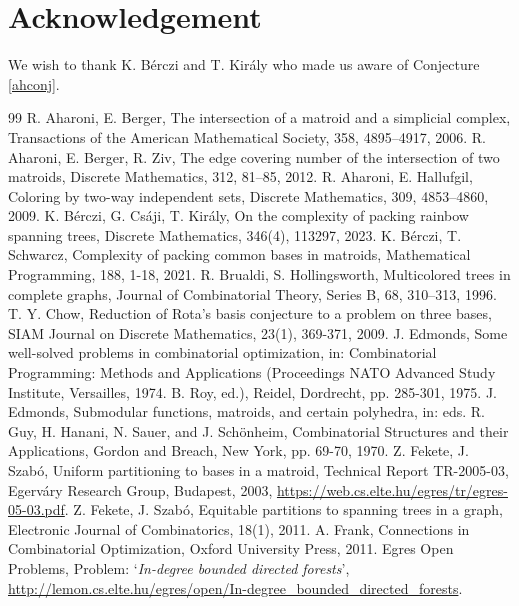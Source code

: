 \documentclass{article}
\begin{document}
\section*{Acknowledgement}
We wish to thank K. Bérczi and T. Kir\'aly who made us aware of Conjecture \ref{ahconj}.
\begin{thebibliography}{99}
 R. Aharoni, E. Berger, The intersection of a matroid and a simplicial complex, Transactions of the  American Mathematical Society, 358, 4895--4917, 2006.
 R. Aharoni, E. Berger, R. Ziv, The edge covering number of the intersection of two matroids, Discrete Mathematics, 312, 81--85, 2012.
 R. Aharoni, E. Hallufgil, Coloring by two-way independent sets, Discrete Mathematics, 309, 4853--4860, 2009.
 K. Bérczi, G. Cs\'aji, T. Kir\'aly, On the complexity of packing rainbow spanning trees, Discrete Mathematics, 346(4), 113297, 2023.
  K. Bérczi, T. Schwarcz, Complexity of packing common bases in matroids, Mathematical Programming, 188, 1-18, 2021.
 R. Brualdi, S. Hollingsworth, Multicolored trees in complete graphs, Journal of Combinatorial Theory, Series B, 68, 310–313, 1996.
 T. Y. Chow, Reduction of Rota's basis conjecture to a problem on three bases, SIAM Journal on Discrete Mathematics, 23(1), 369-371, 2009.
 J. Edmonds, Some well-solved problems in combinatorial optimization, in: Combinatorial Programming: Methods and Applications (Proceedings NATO Advanced Study Institute, Versailles, 1974. B. Roy, ed.), Reidel, Dordrecht, pp. 285-301, 1975.
 J. Edmonds, Submodular functions, matroids, and certain polyhedra, in: eds. R. Guy, H. Hanani, N. Sauer, and J. Sch{\"o}nheim, Combinatorial Structures and their Applications, Gordon and Breach, New York, pp. 69-70, 1970.
 Z. Fekete, J. Szab\'o, Uniform partitioning to bases in a matroid, Technical Report TR-2005-03, Egerv\' ary Research Group, Budapest, 2003, \url{https://web.cs.elte.hu/egres/tr/egres-05-03.pdf}.
 Z. Fekete, J. Szab\'o, Equitable partitions to spanning trees in a graph, Electronic Journal of Combinatorics, 18(1), 2011.
 A. Frank,  Connections in Combinatorial Optimization, Oxford University Press, 2011.
 Egres Open Problems, Problem: `{\it In-degree bounded directed forests}', \url{http://lemon.cs.elte.hu/egres/open/In-degree_bounded_directed_forests}.

\end{thebibliography}
\end{document}
